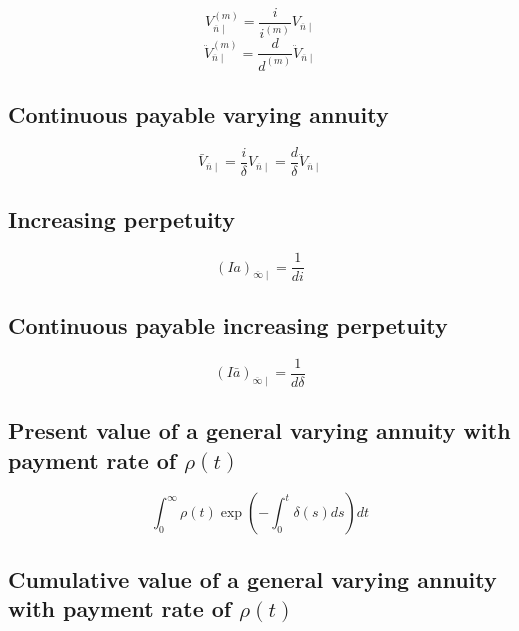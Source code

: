 \documentclass[
]{book}
\begin{document}
\[V^{(m)}_{\overline{n}\mid}=\frac{i}{i^{(m)}}V_{\overline{n}\mid}\]
\[\ddot{V}^{(m)}_{\overline{n}\mid}=\frac{d}{d^{(m)}}\ddot{V}_{\overline{n}\mid}\]

\hypertarget{continuous-payable-varying-annuity}{%
\subsection*{Continuous payable varying annuity}\label{continuous-payable-varying-annuity}}

\[\bar{V}_{\overline{n}\mid}=\frac{i}{\delta}V_{\overline{n}\mid}=\frac{d}{\delta}\ddot{V}_{\overline{n}\mid}\]

\hypertarget{increasing-perpetuity}{%
\subsection*{Increasing perpetuity}\label{increasing-perpetuity}}

\[(Ia)_{\overline{\infty}\mid}=\frac{1}{di}\]

\hypertarget{continuous-payable-increasing-perpetuity}{%
\subsection*{Continuous payable increasing perpetuity}\label{continuous-payable-increasing-perpetuity}}

\[(I\bar{a})_{\overline{\infty}\mid}=\frac{1}{d\delta}\]

\hypertarget{present-value-of-a-general-varying-annuity-with-payment-rate-of-rhot}{%
\subsection*{\texorpdfstring{Present value of a general varying annuity with payment rate of \(\rho(t)\)}{Present value of a general varying annuity with payment rate of \textbackslash rho(t)}}\label{present-value-of-a-general-varying-annuity-with-payment-rate-of-rhot}}

\[\int_0^{\infty}\rho(t)\exp\left(-\int_0^t\delta(s)ds\right)dt\]

\hypertarget{cumulative-value-of-a-general-varying-annuity-with-payment-rate-of-rhot}{%
\subsection*{\texorpdfstring{Cumulative value of a general varying annuity with payment rate of \(\rho(t)\)}{Cumulative value of a general varying annuity with payment rate of \textbackslash rho(t)}}\label{cumulative-value-of-a-general-varying-annuity-with-payment-rate-of-rhot}}
\end{document}
